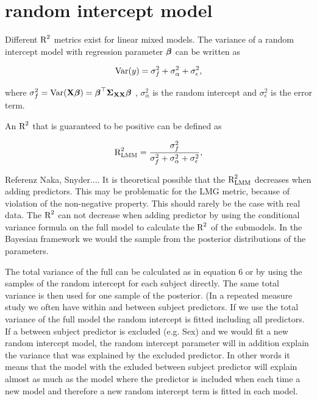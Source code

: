 \documentclass[11pt,a4paper,twoside]{book}
\begin{document}
\section{random intercept model}

Different $\text{R}^2$ metrics exist for linear mixed models. The variance of a random intercept model with regression parameter ${\boldsymbol{\beta}}$ can be written as

      \begin{align} 
        \operatorname{Var}(y) = \sigma_{f}^2  + \sigma_{\alpha}^2 + \sigma_{\epsilon}^2, 
        \end{align}

where $\sigma_{f}^2 = \operatorname{Var}({\mathbf{X}} {\boldsymbol{\beta}}) = {\boldsymbol{\beta}}^\top {\boldsymbol{\Sigma}}{}_{{\mathbf{X}} {\mathbf{X}}}  {\boldsymbol{\beta}}$ , $\sigma_{\alpha}^2 $ is the random intercept and $\sigma_{\epsilon}^2$ is the error term. 

An $\text{R}^2$ that is guaranteed to be positive can be defined as

   \begin{align} 
\text{R}^2_{\text{LMM}} = \frac{\sigma_{f}^2}{\sigma_{f}^2 + \sigma_{\alpha}^2 + \sigma_{\epsilon}^2},
\end{align}

Referenz Naka, Snyder.... It is theoretical possible that the $\text{R}^2_{\text{LMM}}$ decreases when adding predictors. This may be problematic for the LMG metric, because of violation of the non-negative property. This should rarely be the case with real data. The $\text{R}^2$ can not decrease when adding predictor by using the conditional variance formula on the full model to calculate the $\text{R}^2$ of the submodels. In the Bayesian framework we would the sample from the posterior distributions of the parameters. 

The total variance of the full can be calculated as in equation 6 or by using the samples of the random intercept for each subject directly. The same total variance is then used for one sample of the posterior. (In a repeated measure study we often have within and between subject predictors. If we use the total variance of the full model the random intercept is fitted including all predictors. If a between subject predictor is excluded (e.g. Sex) and we would fit a new random intercept model, the random intercept parameter will in addition explain the variance that was explained by the excluded predictor. In other words it means that the model with the exluded between subject predictor will explain almost as much as the model where the predictor is included when each time a new model and therefore a new random intercept term is fitted in each model. 
\end{document}
